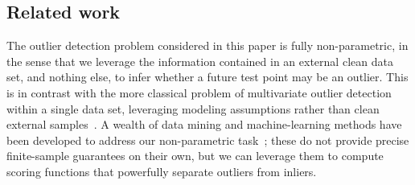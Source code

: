 \documentclass[11pt]{article}
\def\R{\mathbb{R}}
\def\Chat{\hat{\mathcal{C}}}
\begin{document}


\subsection{Related work}

The outlier detection problem considered in this paper is fully non-parametric, in the sense that we leverage the information contained in an external clean data set, and nothing else, to infer whether a future test point may be an outlier. 
This is in contrast with the more classical problem of multivariate outlier detection within a single data set, leveraging modeling assumptions rather than clean external samples~\cite{wilks1963multivariate,hawkins1980identification,riani2009finding,cerioli2010multivariate}.
A wealth of data mining and machine-learning methods have been developed to address our non-parametric task~\cite{khan2014one,agrawal2015survey,aggarwal2015outlier,sabokrou2018adversarially,chalapathy2019deep}; these do not provide precise finite-sample guarantees on their own, but we can leverage them to compute scoring functions that powerfully separate outliers from inliers.
\end{document}
